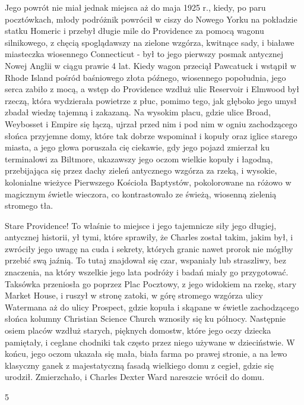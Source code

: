 Jego powrót nie miał jednak miejsca aż do maja 1925 r., kiedy, po paru pocztówkach, młody podróżnik powrócił w ciszy do Nowego Yorku na pokładzie statku Homeric i przebył długie mile do Providence za pomocą wagonu silnikowego, z chęcią spoglądawszy na zielone wzgórza, kwitnące sady, i białawe miasteczka wiosennego Connecticut - był to jego pierwszy posmak antycznej Nowej Anglii w ciągu prawie 4 lat. Kiedy wagon przeciął Pawcatuck i wstąpił w Rhode Island pośród baśniowego złota późnego, wiosennego popołudnia, jego serca zabiło z mocą, a wstęp do Providence wzdłuż ulic Reservoir i Elmwood był rzeczą, która wydzierała powietrze z płuc, pomimo tego, jak głęboko jego umysł zbadał wiedzę tajemną i zakazaną. Na wysokim placu, gdzie ulice Broad, Weybosset i Empire się łączą, ujrzał przed nim i pod nim w ogniu zachodzącego słońca przyjemne domy, które tak dobrze wspominał i kopuły oraz iglice starego miasta, a jego głowa poruszała cię ciekawie, gdy jego pojazd zmierzał ku terminalowi za Biltmore, ukazawszy jego oczom wielkie kopuły i łagodną, przebijająca się przez dachy zieleń antycznego  wzgórza za rzeką, i wysokie, kolonialne wieżyce Pierwszego Kościoła Baptystów, pokolorowane na różowo w magicznym świetle wieczora, co kontrastowało ze świeżą, wiosenną zielenią stromego tła. 

Stare Providence! To właśnie to miejsce i jego tajemnicze siły jego długiej, antycznej historii, ył tymi, które sprawiły, że Charles został takim, jakim był, i zwróciły jego uwagę na cuda i sekrety, których granic nawet prorok nie mógłby przebić swą jaźnią. To tutaj znajdował się czar, wspaniały lub straszliwy, bez znaczenia, na który wszelkie jego lata podróży i badań miały go przygotować. Taksówka przeniosła go poprzez Plac Pocztowy, z jego widokiem na rzekę, stary Market House, i ruszył w stronę zatoki, w górę stromego wzgórza ulicy Watermana aż do ulicy Prospect, gdzie kopuła i skąpane w świetle zachodzącego słońca kolumny Christian Science Church wznosiły się ku północy. Następnie osiem placów wzdłuż starych, pięknych domostw, które jego oczy dziecka pamiętały, i ceglane chodniki tak często przez niego używane w dzieciństwie. W końcu, jego oczom ukazała się mała, biała farma po prawej stronie, a na lewo klasyczny ganek z majestatyczną fasadą wielkiego domu z cegieł, gdzie się urodził. Zmierzchało, i Charles Dexter Ward nareszcie wrócił do domu. 

\begin{center}
5
\end{center}

